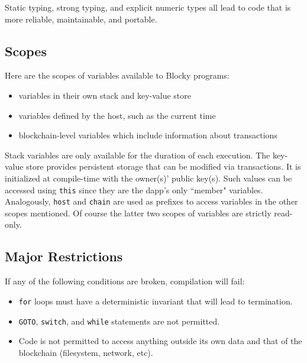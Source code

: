 \documentclass[letterpaper]{article}
\begin{document}
Static typing, strong typing, and explicit numeric types all lead to code that is more reliable, maintainable, and portable. 

\subsection{Scopes}
Here are the scopes of variables available to Blocky programs:
\begin{itemize}
  \item{variables in their own stack and key-value store}
  \item{variables defined by the host, such as the current time}
  \item{blockchain-level variables which include information about transactions}
\end{itemize}
Stack variables are only available for the duration of each execution. The key-value store provides persistent storage that can be modified via transactions. It is initialized at compile-time with the owner(s)' public key(s). Such values can be accessed using \texttt{this} since they are the dapp's only ``member" variables. Analogously, \texttt{host} and \texttt{chain} are used as prefixes to access variables in the other scopes mentioned. Of course the latter two scopes of variables are strictly read-only.

\subsection{Major Restrictions}
If any of the following conditions are broken, compilation will fail:
\begin{itemize}
  \item{\texttt{for} loops must have a deterministic invariant that will lead to termination.}
  \item{\texttt{GOTO}, \texttt{switch}, and \texttt{while} statements are not permitted.}
  \item{Code is not permitted to access anything outside its own data and that of the blockchain (filesystem, network, etc).}
\end{itemize}
\end{document}
